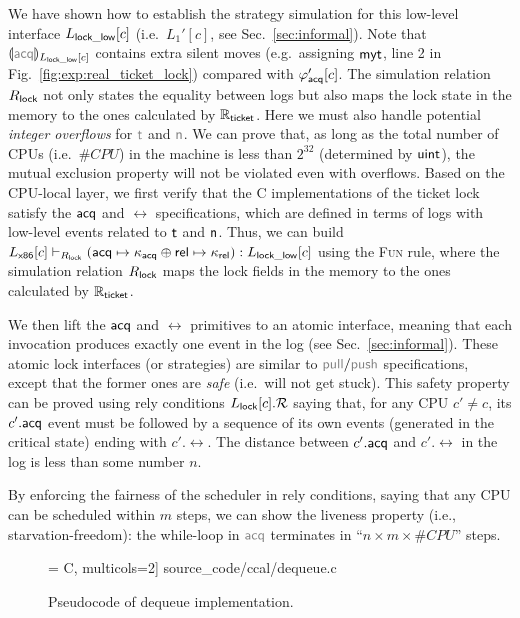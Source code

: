 We have shown how to establish the strategy simulation
for this low-level interface $L_{\mathsf{\textcolor{black}{lock\_low}}}[c]$ (i.e.\, $L_1'[c]$, see Sec.~\ref{sec:informal}).
Note that $\ssem{\commc{acq}}{L_\comm{lock\_low}[c]}$ contains extra silent moves (e.g.\, assigning $\mathsf{\textcolor{black}{myt}}$, line 2 in Fig.~\ref{fig:exp:real_ticket_lock}) compared with $\varphi_{\mathsf{\textcolor{black}{acq}}}'[c]$.
The simulation relation 
$R_{\mathsf{\textcolor{black}{lock}}}$ not only states the equality between logs but also maps the lock
state in the memory to the ones calculated by $\mathbb{R}_{\mathsf{\textcolor{black}{ticket}}}$.
Here we must also handle potential \emph{integer overflows} for $\commc{t}$ and $\commc{n}$.
We can prove that, as long as the total number of CPUs (i.e.\, $\#CPU$) in the machine is less than $2^{32}$ (determined by $\mathsf{\textcolor{black}{uint}}$), the mutual exclusion property will not be violated  even with overflows. 
Based on the CPU-local layer, we first verify that the C implementations of 
the ticket lock satisfy the $\mathsf{acq}$ and $\rel$ specifications,
which are defined in terms of logs with low-level events
related to $\mathsf{\textcolor{black}{t}}$ and $\mathsf{\textcolor{black}{n}}$.
Thus, we can build $L_\mathsf{x86}[c] \vdash_{R_{\mathsf{\textcolor{black}{lock}}}} (\mathsf{acq} \mapsto \kappa_{\mathsf{acq}}
\oplus \mathsf{rel} \mapsto \kappa_{\mathsf{rel}}) : L_{\mathsf{\textcolor{black}{lock\_low}}}[c]$
using the \textsc{Fun} rule,
where the simulation relation $R_{\mathsf{\textcolor{black}{lock}}}$ maps the lock
fields in the memory to the ones calculated by $\mathbb{R}_{\mathsf{\textcolor{black}{ticket}}}$.

We then lift the $\mathsf{acq}$ and $\rel$ primitives to an atomic interface, meaning that each
invocation produces exactly one event in the log (see Sec.~\ref{sec:informal}).
These atomic lock interfaces (or strategies) are similar to $\cpull/\cpush$ specifications,
except that the former ones are \emph{safe} (i.e.\, will not get stuck).
This safety property can be proved using rely conditions $L_{\mathsf{\textcolor{black}{lock}}}[c].\mathcal{R}$ saying that,
for any CPU $c'\neq c$, its $c'.\mathsf{acq}$ event must be followed by a sequence of its own events (generated in the critical state)
ending with $c'.\rel$. The distance between $c'.\mathsf{acq}$ and $c'.\rel$ in the log is less than some number $n$.

By enforcing the fairness of the scheduler in rely conditions, saying that any CPU can be scheduled
within $m$ steps, we can show the liveness property (i.e., starvation-freedom): the while-loop in $\commc{acq}$ terminates
in ``$n \times m \times \#CPU$'' steps.


\begin{figure}
 = C, multicols=2] {source_code/ccal/dequeue.c}
\caption{Pseudocode of dequeue implementation.}
\label{fig:exp:dequeue}
\end{figure}


